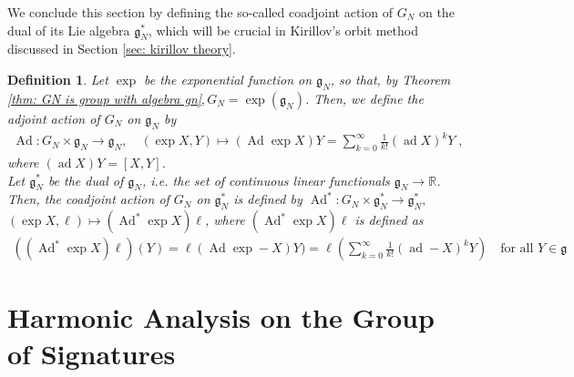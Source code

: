 \documentclass[pdflatex,sn-mathphys-num]{sn-jnl}
\theoremstyle{thmstyletwo}
\newtheorem{definition}{Definition}[section]
\theoremstyle{thmstyleone}
\theoremstyle{thmstyletwo}
\newcommand{\fancyg}{\mathfrak{g}}
\newcommand{\coadjoint}{\operatorname{Ad}^*}
\newcommand{\Adjoint}{\operatorname{Ad}}
\newcommand{\adjoint}{\operatorname{ad}}
\begin{document}
	We conclude this section by defining the so-called coadjoint action of $G_N$ on the dual of its Lie algebra $\fancyg_N^*$, which will be crucial in Kirillov's orbit method discussed in Section \ref{sec: kirillov theory}.
	\begin{definition}\label{def: adj and coadj action}
    Let $\exp$ be the exponential function on $\fancyg_N$, so that, by Theorem \ref{thm: GN is group with algebra gn}$, G_N = \exp(\fancyg_N)$. Then, we define the adjoint action of $G_N$ on $\fancyg_N$ by
		\begin{align*}
			\Adjoint : G_N\times\fancyg_N \to \fancyg_N, \quad
			(\exp X, Y) \mapsto (\Adjoint \operatorname{exp}X)Y = \sum_{k=0}^{\infty}\frac{1}{k!}(\adjoint X)^k Y \;,
		\end{align*}
		where $(\adjoint X) Y = [X,Y]$.\\
		Let $\fancyg_N^*$ be the dual of $\fancyg_N$, i.e. the set of continuous linear functionals $\mathfrak{g}_N \to \mathbb{R}$. Then, the coadjoint action of $G_N$ on $\fancyg_N^*$ is defined by $\coadjoint: G_N\times\fancyg_N^* \to \fancyg_N^*,$ $(\exp X, \ell) \mapsto (\coadjoint \exp X)\ell$, where $(\coadjoint \exp X)\ell$ is defined as
		\begin{align*}
			((\coadjoint \operatorname{exp}X)\ell)(Y) = \ell(\Adjoint \operatorname{exp}-X)Y) = \ell\left(\sum_{k=0}^{\infty}\frac{1}{k!}(\adjoint -X)^k Y\right) \quad \text{for all } Y \in \fancyg
		\end{align*}
	\end{definition}
	\section{Harmonic Analysis on the Group of Signatures}\label{sec: Harmonic analysis}
\end{document}
